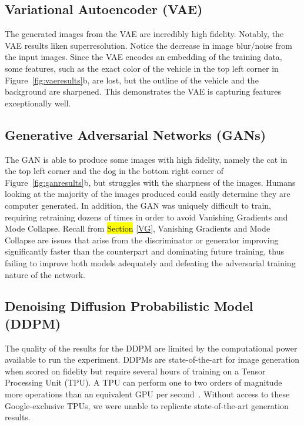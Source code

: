 \documentclass[technologies,article,accept,pdftex,moreauthors]{Definitions/mdpi}
\begin{document}
\subsection{Variational Autoencoder (VAE)}
The generated images from the VAE are incredibly high fidelity. Notably, the VAE results liken superresolution. Notice the decrease in image blur/noise from the input images. Since the VAE encodes an embedding of the training data, some features, such as the exact color of the vehicle in the top left corner in Figure~\ref{fig:vaeresults}b, are lost, but the outline of the vehicle and the background are sharpened. This demonstrates the VAE is capturing features exceptionally well.

\subsection{Generative Adversarial Networks (GANs)}

The GAN is able to produce some images with high fidelity, namely the cat in the top left corner and the dog in the bottom right corner of Figure~\ref{fig:ganresults}b, but struggles with the sharpness of the images. Humans looking at the majority of the images produced could easily determine they are computer generated. In addition, the GAN was uniquely difficult to train, requiring retraining dozens of times in order to avoid Vanishing Gradients and Mode Collapse. Recall from \hl{Section} %
 \ref{VG}, Vanishing Gradients and Mode Collapse are issues that arise from the discriminator or generator improving significantly faster than the counterpart and dominating future training, thus failing to improve both models adequately and defeating the adversarial training nature of the network.

\subsection{Denoising Diffusion Probabilistic Model (DDPM)}
\label{ddpm_result_}
The quality of the results for the DDPM are limited by the computational power available to run the experiment. DDPMs are state-of-the-art for image generation when scored on fidelity but require several hours of training on a Tensor Processing Unit (TPU). A TPU can perform one to two orders of magnitude more operations than an equivalent GPU per second~\cite{googlecloud}. Without access to these Google-exclusive TPUs, we were unable to replicate state-of-the-art generation results.  
\end{document}
